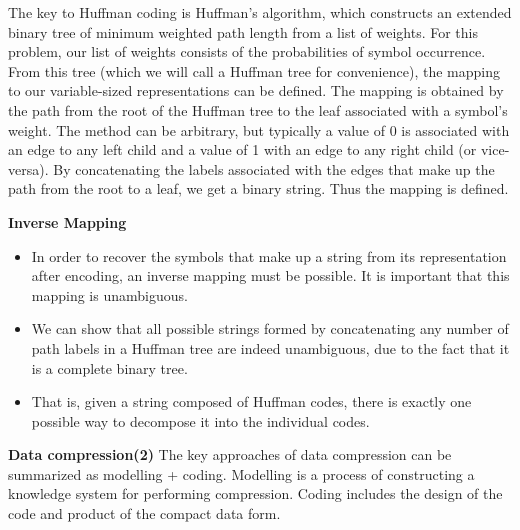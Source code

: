 {
The key to Huffman coding is Huffman's algorithm, which constructs an extended binary tree of minimum weighted path length from a list of weights. For this problem, our list of weights consists of the probabilities of symbol occurrence. From this tree (which we will call a Huffman tree for convenience), the mapping to our variable-sized representations can be defined.
}
{
The mapping is obtained by the path from the root of the Huffman tree to the leaf associated with a symbol's weight. The method can be arbitrary, but typically a value of 0 is associated with an edge to any left child and a value of 1 with an edge to any right child (or vice-versa). By concatenating the labels associated with the edges that make up the path from the root to a leaf, we get a binary string. Thus the mapping is defined.
}
{
\noindent \textbf{Inverse Mapping}
\begin{itemize}
\item In order to recover the symbols that make up a string from its representation after encoding, an inverse mapping must be possible. It is important that this mapping is unambiguous. \item We can show that all possible strings formed by concatenating any number of path labels in a Huffman tree are indeed unambiguous, due to the fact that it is a complete binary tree. \item That is, given a string composed of Huffman codes, there is exactly one possible way to decompose it into the individual codes.
\end{itemize}
}

{
\noindent \textbf{Data compression(2)}
The key approaches of data compression can be summarized as modelling + coding.
Modelling is a process of constructing a knowledge system for
performing compression. Coding includes the design of the code and product of the compact data form.

}












